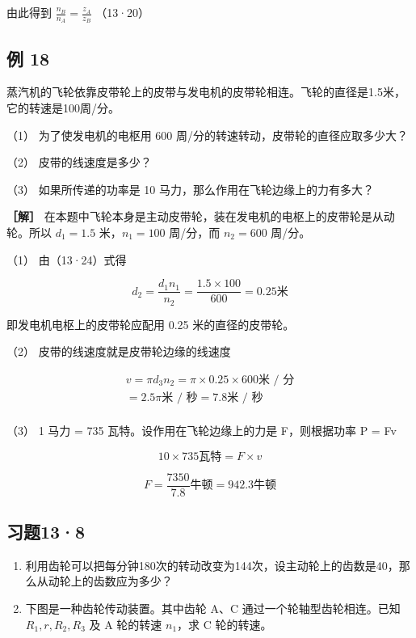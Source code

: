 由此得到 \(\frac{n_B}{n_A} = \frac{z_A}{z_B}\) （13·20）

\subsection{例 18}\label{ux4f8b-18-1}

蒸汽机的飞轮依靠皮带轮上的皮带与发电机的皮带轮相连。飞轮的直径是1.5米，它的转速是100周/分。

（1） 为了使发电机的电枢用 600 周/分的转速转动，皮带轮的直径应取多少大？

（2） 皮带的线速度是多少？

（3） 如果所传递的功率是 10 马力，那么作用在飞轮边缘上的力有多大？

\textbf{［解］}
在本题中飞轮本身是主动皮带轮，装在发电机的电枢上的皮带轮是从动轮。所以
\(d_{1}=1.5\) 米，\(n_{1}=100\) 周/分，而 \(n_{2}=600\) 周/分。

（1） 由（13·24）式得

\[
d _ {2} = \frac {d _ {1} n _ {1}}{n _ {2}} = \frac {1.5 \times 100}{600} = 0.25 \text{米}
\]

即发电机电枢上的皮带轮应配用 0.25 米的直径的皮带轮。

（2） 皮带的线速度就是皮带轮边缘的线速度

\[
\begin{array}{l} v = \pi d _ {3} n _ {2} = \pi \times 0.25 \times 600 \text{米 / 分} \\ = 2.5 \pi \text{米 / 秒} = 7.8 \text{米 / 秒} \\ \end{array}
\]

（3） 1 马力 = 735 瓦特。设作用在飞轮边缘上的力是 F，则根据功率 P = Fv

\[
10 \times 735 \text{瓦特} = F \times v
\]

\[
F = \frac {7350}{7.8} \text{牛顿} = 942.3 \text{牛顿}
\]

\subsection{习题13·8}\label{ux4e60ux9898138}

\begin{enumerate}
\def\labelenumi{\arabic{enumi}.}
\item
  利用齿轮可以把每分钟180次的转动改变为144次，设主动轮上的齿数是40，那么从动轮上的齿数应为多少？
\item
  下图是一种齿轮传动装置。其中齿轮 A、C 通过一个轮轴型齿轮相连。已知
  \(R_{1}, r, R_{2}, R_{3}\) 及 A 轮的转速 \(n_{1}\)，求 C 轮的转速。
\end{enumerate}

